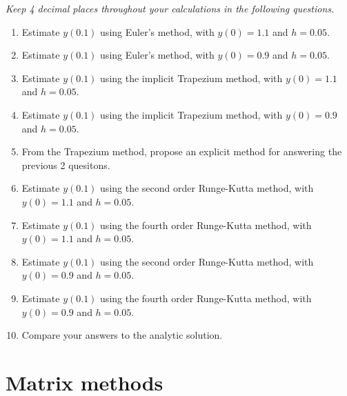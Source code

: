\documentclass[a4paper,12pt,openany,notitlepage]{book}
\newcounter{num_exercice}
\begin{document}
\textit{Keep 4 decimal places throughout your calculations in the following questions.}
\begin{enumerate}[label=\alph*)]
	\item Estimate $y(0.1)$ using Euler's method, with $y(0)=1.1$ and $h=0.05$.
	
	\item Estimate $y(0.1)$ using Euler's method, with $y(0)=0.9$ and $h=0.05$.
	
	\item Estimate $y(0.1)$ using the implicit Trapezium method, with $y(0)=1.1$ and $h=0.05$.
	
	\item Estimate $y(0.1)$ using the implicit Trapezium method, with $y(0)=0.9$ and $h=0.05$.
	
	\item From the Trapezium method, propose an explicit method for answering the previous 2 quesitons.
	
	\item Estimate $y(0.1)$ using the second order Runge-Kutta method, with $y(0)=1.1$ and $h=0.05$.
	
	\item Estimate $y(0.1)$ using the fourth order Runge-Kutta method, with $y(0)=1.1$ and $h=0.05$.
	
	\item Estimate $y(0.1)$ using the second order Runge-Kutta method, with $y(0)=0.9$ and $h=0.05$.
	
	\item Estimate $y(0.1)$ using the fourth order Runge-Kutta method, with $y(0)=0.9$ and $h=0.05$.
	
	\item Compare your answers to the analytic solution.
\end{enumerate}



\chapter{Matrix methods}
\end{document}
